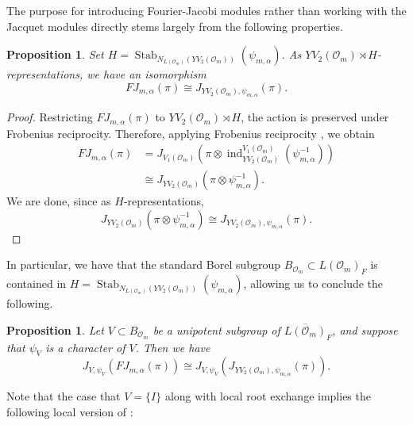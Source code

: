 \documentclass[11pt,reqno]{amsart}
\newtheorem{Prop}[Thm]{Proposition}
\theoremstyle{definition}
\theoremstyle{remark}
\theoremstyle{definition}
\begin{document}
The purpose for introducing Fourier-Jacobi modules rather than working with the Jacquet modules directly stems largely from the following properties.

\begin{Prop}
Set $H=\operatorname{Stab}_{N_{L({\mathcal{O}}_m)}(YV_2({\mathcal{O}}_m))}(\psi_{m,{\alpha}})$. As $YV_2({\mathcal{O}}_m)\rtimes H$-representations, we have an isomorphism
\[
FJ_{m,{\alpha}}(\pi) \cong J_{YV_2({\mathcal{O}}_m),\psi_{m,{\alpha}}}(\pi).
\]
\end{Prop}
\begin{proof}  Restricting $FJ_{m,{\alpha}}(\pi)$ to $YV_2({\mathcal{O}}_m)\rtimes H$, the action is preserved under Frobenius reciprocity. Therefore, applying Frobenius reciprocity \cite[Lemma 2.3.6]{GGS}, we obtain
\begin{align*}
FJ_{m,{\alpha}}(\pi) 		&= J_{V_1({\mathcal{O}}_m)}\left(\pi\otimes\operatorname{ind}_{YV_2({\mathcal{O}}_m)}^{V_1({\mathcal{O}}_m)}(\psi^{-1}_{m,{\alpha}})\right)\\
				&\cong J_{YV_2({\mathcal{O}}_m)}\left(\pi\otimes \psi^{-1}_{m,{\alpha}}\right).
				
\end{align*}
We are done, since as $H$-representations,
\[
J_{YV_2({\mathcal{O}}_m)}\left(\pi\otimes \psi^{-1}_{m,{\alpha}}\right)\cong J_{YV_2({\mathcal{O}}_m),\psi_{m,{\alpha}}}(\pi).
\]
\end{proof}
In particular, we have that the standard Borel subgroup $B_{{\mathcal{O}}_m}\subset L({\mathcal{O}}_m)_F$ is contained in $H=\operatorname{Stab}_{N_{L({\mathcal{O}}_m)}(YV_2({\mathcal{O}}_m))}(\psi_{m,{\alpha}})$, allowing us to conclude the following.
\begin{Prop}\label{Prop: FJ property}
Let $V\subset B_{{\mathcal{O}}_m}$ be a unipotent subgroup of $\overline{L({\mathcal{O}}_m)}_F$, and suppose that $\psi_V$ is a character of $V$. Then we have 
\[
J_{V, \psi_V}(FJ_{m,{\alpha}}(\pi)) \cong J_{V,\psi_V}(J_{YV_2({\mathcal{O}}_m),\psi_{m,{\alpha}}}(\pi)).
\]
\end{Prop}

Note that the case that $V = \{I\}$ along with local root exchange implies the following local version of \cite[Lemma 1.1]{GRS2}:
\end{document}
